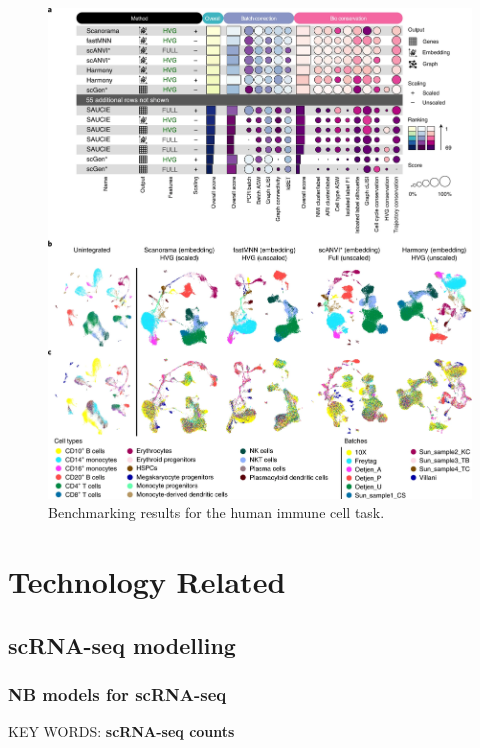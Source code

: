 \documentclass[
]{book}
\begin{document}
\begin{figure}
\centering
\includegraphics{./figs/singleCell/benchmarking2.jpg}
\caption{Benchmarking results for the human immune cell task.}
\end{figure}

\hypertarget{technology-related}{%
\chapter{Technology Related}\label{technology-related}}

\hypertarget{scrna-seq-modelling}{%
\section{scRNA-seq modelling}\label{scrna-seq-modelling}}

\hypertarget{nb-models-for-scrna-seq}{%
\subsection{NB models for scRNA-seq}\label{nb-models-for-scrna-seq}}

KEY WORDS: \textbf{scRNA-seq counts}
\end{document}
